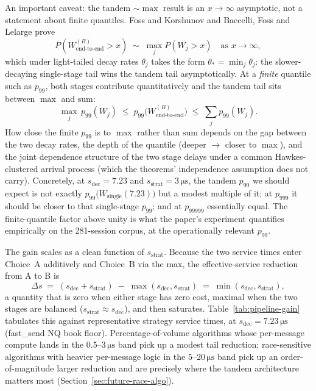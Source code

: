 \documentclass[11pt]{article}
\begin{document}
An important caveat: the tandem $\sim \max$ result is an $x \to \infty$ asymptotic, not a statement about finite quantiles. Foss and Korshunov \citep{fosskorshunov2000} and Baccelli, Foss and Lelarge \citep{baccellifosslelarge2005} prove
$$
P(W_{\mathrm{end\text{-}to\text{-}end}}^{(B)} > x) \;\sim\; \max_j P(W_j > x) \quad \text{as } x \to \infty,
$$
which under light-tailed decay rates $\theta_j$ takes the form $\theta_* = \min_j \theta_j$: the slower-decaying single-stage tail wins the tandem tail asymptotically. At a \emph{finite} quantile such as $p_{99}$, both stages contribute quantitatively and the tandem tail sits between $\max$ and $\mathrm{sum}$:
$$
\max_j\, p_{99}(W_j) \;\leq\; p_{99}\bigl(W_{\mathrm{end\text{-}to\text{-}end}}^{(B)}\bigr) \;\leq\; \sum_j p_{99}(W_j).
$$
How close the finite $p_{99}$ is to $\max$ rather than $\mathrm{sum}$ depends on the gap between the two decay rates, the depth of the quantile (deeper $\to$ closer to $\max$), and the joint dependence structure of the two stage delays under a common Hawkes-clustered arrival process (which the theorems' independence assumption does not carry). Concretely, at $s_{\mathrm{dec}} = 7.23$ and $s_{\mathrm{strat}} = 3\,\si{\micro\second}$, the tandem $p_{99}$ we should expect is not exactly $p_{99}\bigl(W_{\mathrm{single}}(7.23)\bigr)$ but a modest multiple of it; at $p_{999}$ it should be closer to that single-stage $p_{99}$; and at $p_{99999}$ essentially equal. The finite-quantile factor above unity is what the paper's experiment quantifies empirically on the 281-session corpus, at the operationally relevant $p_{99}$.

The gain scales as a clean function of $s_{\mathrm{strat}}$. Because the two service times enter Choice~A additively and Choice~B via the max, the effective-service reduction from A to B is
$$
\Delta s \;=\; (s_{\mathrm{dec}} + s_{\mathrm{strat}}) \;-\; \max(s_{\mathrm{dec}}, s_{\mathrm{strat}}) \;=\; \min(s_{\mathrm{dec}}, s_{\mathrm{strat}}),
$$
a quantity that is zero when either stage has zero cost, maximal when the two stages are balanced ($s_{\mathrm{strat}} \approx s_{\mathrm{dec}}$), and then saturates. Table~\ref{tab:pipeline-gain} tabulates this against representative strategy service times, at $s_{\mathrm{dec}} = 7.23\,\si{\micro\second}$ (fast\_send NQ book floor). Percentage-of-volume algorithms whose per-message compute lands in the $0.5$--$3\,\si{\micro\second}$ band pick up a modest tail reduction; race-sensitive algorithms with heavier per-message logic in the $5$--$20\,\si{\micro\second}$ band pick up an order-of-magnitude larger reduction and are precisely where the tandem architecture matters most (Section~\ref{sec:future-race-algo}).
\end{document}

